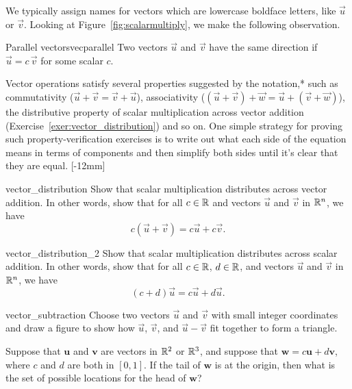 \documentclass{watsonbook}
\begin{document}
We typically assign names for vectors which are lowercase boldface
letters, like $\vec{u}$ or $\vec{v}$.  Looking at 
Figure~\ref{fig:scalarmultiply}, we make the following observation. 

\begin{obs}{Parallel vectors}{vecparallel} \bang{-5mm}
  Two vectors $\vec{u}$ and $\vec{v}$ have the
  same direction if $\vec{u} = c \, \vec{v}$ for some scalar $c$. 
\end{obs}

Vector operations satisfy several properties suggested by the
notation,* such as commutativity
($\vec{u} + \vec{v} = \vec{v} + \vec{u}$), associativity
($(\vec{u} + \vec{v}) + \vec{w} = \vec{u} + (\vec{v} + \vec{w})$), the
distributive property of scalar multiplication across vector addition
(Exercise~\ref{exer:vector_distribution}) and so on. One simple strategy
for proving such property-verification exercises is to 
write out what each side of the equation means in terms of components and
then simplify both sides until it's clear that they are equal. [-12mm]

\begin{exercise}{}{vector_distribution}
  Show that scalar multiplication distributes across vector
  addition. In other words, show that for all $c\in \mathbb{R}$ and vectors
  $\vec{u}$ and $\vec{v}$ in $\mathbb{R}^n$, we have 
  \[
    c(\vec{u} + \vec{v})= c
    \vec{u} + c \vec{v}. 
  \] 
\end{exercise}

\begin{exercise}{}{vector_distribution_2}
  Show that scalar multiplication distributes across scalar 
  addition. In other words, show that for all $c\in \mathbb{R}$, $d \in \mathbb{R}$, and vectors
  $\vec{u}$ and $\vec{v}$ in $\mathbb{R}^n$, we have 
  \[
    (c+d)\vec{u}  = c \vec{u} + d \vec{u}. 
  \] 
\end{exercise}

\begin{exercise}{}{vector_subtraction}
  Choose two vectors $\vec{u}$ and $\vec{v}$ with small integer
  coordinates and draw a figure to show how $\vec{u}$, $\vec{v}$, and $\vec{u}
  - \vec{v}$
  fit together to form a triangle. 
\end{exercise}

\begin{exercise}{}{}
  Suppose that $\mathbf{u}$ and $\mathbf{v}$ are vectors in $\mathbb{R}^2$ or
  $\mathbb{R}^3$, and suppose that $\mathbf{w} = c \mathbf{u} + d \mathbf{v}$,
  where $c$ and $d$ are both in $[0,1]$. If the tail of $\mathbf{w}$
  is at the origin, then what is the set of possible locations for the
  head of $\mathbf{w}$?
\end{exercise}
\end{document}
